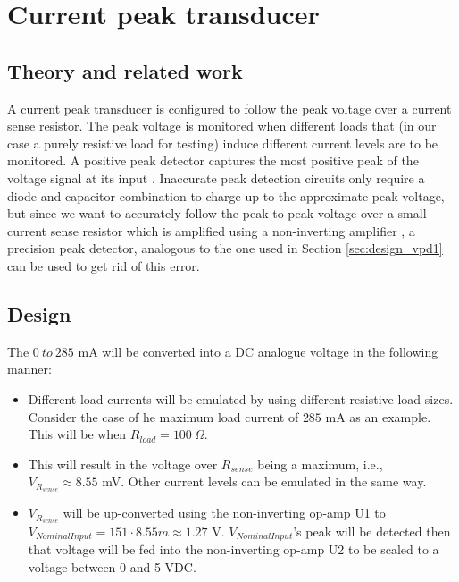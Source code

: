 \chapter{Current peak transducer}

\section{Theory and related work} \label{sec:current_theory}

A current peak transducer is configured to follow the peak voltage over a current sense resistor. The peak voltage is monitored when different loads that (in our case a purely resistive load for testing) induce different current levels are to be monitored. A positive peak detector captures the most positive peak of the voltage signal at its input \cite{precision_peak_detector}. Inaccurate peak detection circuits only require a diode and capacitor combination to charge up to the approximate peak voltage, but since we want to accurately follow the peak-to-peak voltage over a small current sense resistor which is amplified using a non-inverting amplifier \cite{non-inverting}, a precision peak detector, analogous to the one used in Section \ref{sec:design_vpd1} can be used to get rid of this error.

\section{Design} \label{sec:design_current}

The $0 \ to \ 285$ mA will be converted into a DC analogue voltage in the following manner:
\begin{itemize}
    \item Different load currents will be emulated by using different resistive load sizes. Consider the case of he maximum load current of $285$ mA as an example. This  will be when $R_{load}=100 \ \Omega$.
    \item This will result in the voltage over $R_{sense}$ being a maximum, i.e., \\$V_{R_{sense}} \approx 8.55$ mV. Other current levels can be emulated in the same way.
    \item $V_{R_{sense}}$ will be up-converted using the non-inverting op-amp U1 to \\$V_{Nominal Input}=151\cdot8.55m\approx 1.27$ V. $V_{Nominal Input}$'s peak will be detected then that voltage will be fed into the non-inverting op-amp U2 to be scaled to a voltage between 0 and 5 VDC.
\end{itemize}

